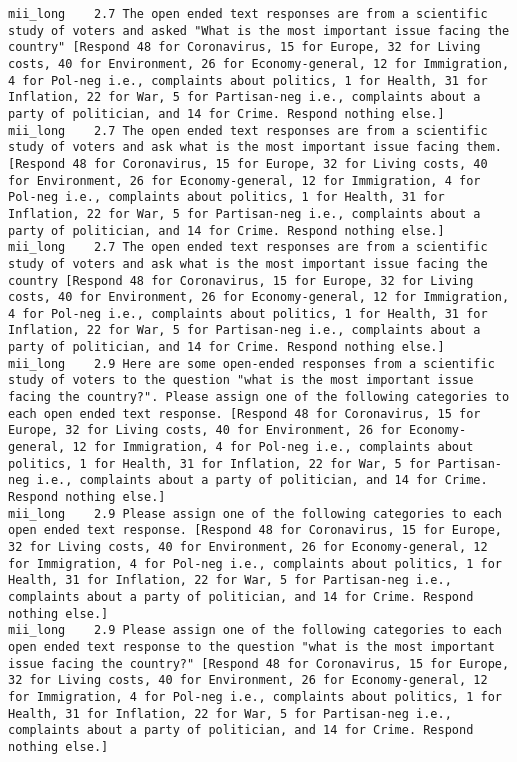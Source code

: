 \begin{lstlisting}[label=lst:promptvariants]
mii_long	2.7	The open ended text responses are from a scientific study of voters and asked "What is the most important issue facing the country" [Respond 48 for Coronavirus, 15 for Europe, 32 for Living costs, 40 for Environment, 26 for Economy-general, 12 for Immigration, 4 for Pol-neg i.e., complaints about politics, 1 for Health, 31 for Inflation, 22 for War, 5 for Partisan-neg i.e., complaints about a party of politician, and 14 for Crime. Respond nothing else.]
mii_long	2.7	The open ended text responses are from a scientific study of voters and ask what is the most important issue facing them. [Respond 48 for Coronavirus, 15 for Europe, 32 for Living costs, 40 for Environment, 26 for Economy-general, 12 for Immigration, 4 for Pol-neg i.e., complaints about politics, 1 for Health, 31 for Inflation, 22 for War, 5 for Partisan-neg i.e., complaints about a party of politician, and 14 for Crime. Respond nothing else.]
mii_long	2.7	The open ended text responses are from a scientific study of voters and ask what is the most important issue facing the country [Respond 48 for Coronavirus, 15 for Europe, 32 for Living costs, 40 for Environment, 26 for Economy-general, 12 for Immigration, 4 for Pol-neg i.e., complaints about politics, 1 for Health, 31 for Inflation, 22 for War, 5 for Partisan-neg i.e., complaints about a party of politician, and 14 for Crime. Respond nothing else.]
mii_long	2.9	Here are some open-ended responses from a scientific study of voters to the question "what is the most important issue facing the country?". Please assign one of the following categories to each open ended text response. [Respond 48 for Coronavirus, 15 for Europe, 32 for Living costs, 40 for Environment, 26 for Economy-general, 12 for Immigration, 4 for Pol-neg i.e., complaints about politics, 1 for Health, 31 for Inflation, 22 for War, 5 for Partisan-neg i.e., complaints about a party of politician, and 14 for Crime. Respond nothing else.]
mii_long	2.9	Please assign one of the following categories to each open ended text response. [Respond 48 for Coronavirus, 15 for Europe, 32 for Living costs, 40 for Environment, 26 for Economy-general, 12 for Immigration, 4 for Pol-neg i.e., complaints about politics, 1 for Health, 31 for Inflation, 22 for War, 5 for Partisan-neg i.e., complaints about a party of politician, and 14 for Crime. Respond nothing else.]
mii_long	2.9	Please assign one of the following categories to each open ended text response to the question "what is the most important issue facing the country?" [Respond 48 for Coronavirus, 15 for Europe, 32 for Living costs, 40 for Environment, 26 for Economy-general, 12 for Immigration, 4 for Pol-neg i.e., complaints about politics, 1 for Health, 31 for Inflation, 22 for War, 5 for Partisan-neg i.e., complaints about a party of politician, and 14 for Crime. Respond nothing else.]

\end{lstlisting}
